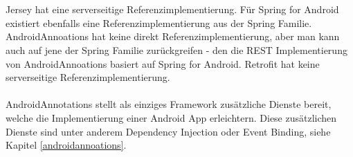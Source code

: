 \\\\
Jersey hat eine serverseitige Referenzimplementierung. Für Spring for Android existiert ebenfalls eine Referenzimplementierung aus der Spring Familie. AndroidAnnoations hat keine direkt Referenzimplementierung, aber man kann auch auf jene der Spring Familie zurückgreifen - den die REST Implementierung von AndroidAnnoations basiert auf Spring for Android. Retrofit hat keine serverseitige Referenzimplementierung.
\\\\
AndroidAnnotations stellt als einziges Framework zusätzliche Dienste bereit, welche die Implementierung einer Android App erleichtern. Diese zusätzlichen Dienste sind unter anderem Dependency Injection oder Event Binding, siehe Kapitel \ref{androidannoations}.


